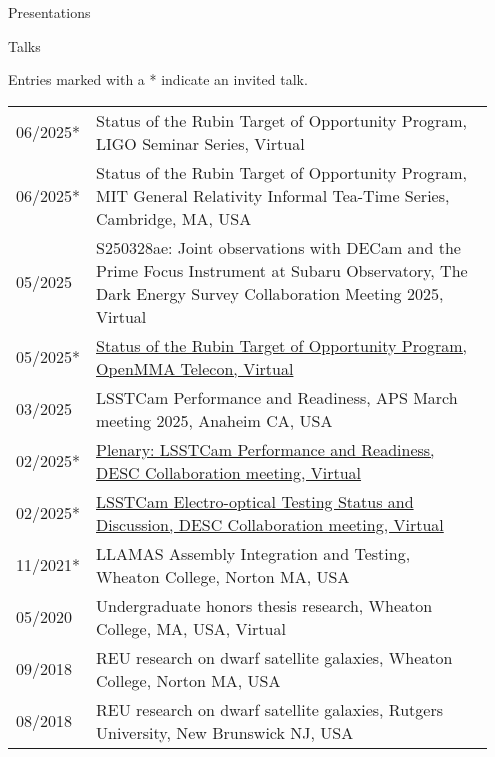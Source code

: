 \documentclass{resume} %
\begin{document}
\begin{rSection}{Presentations}

\begin{rSubsection}{Talks}{}{}{}

Entries marked with a * indicate an invited talk.

    \begin{table}[h]
\begin{tabular}{p{0.07\linewidth} p{0.88\linewidth}}
06/2025* & Status of the Rubin Target of Opportunity Program, LIGO Seminar Series, Virtual\\
06/2025* & Status of the Rubin Target of Opportunity Program, MIT General Relativity Informal Tea-Time Series, Cambridge, MA, USA\\
05/2025 & S250328ae: Joint observations with DECam and the Prime Focus Instrument at Subaru Observatory, The Dark Energy Survey Collaboration Meeting 2025, Virtual\\
05/2025* & \href{https://github.com/scimma/openMMA/wiki/Telecon20250522}{Status of the Rubin Target of Opportunity Program, OpenMMA Telecon, Virtual}\\
03/2025 & LSSTCam Performance and Readiness, APS March meeting 2025, Anaheim CA, USA\\
02/2025* & \href{https://docs.google.com/presentation/d/18RmTzV5id9RSE4_1xui-RJvK5FeGknrt8Ro1nBn32nk/edit?usp=sharing}{Plenary: LSSTCam Performance and Readiness, DESC Collaboration meeting, Virtual}\\
02/2025* & \href{https://docs.google.com/presentation/d/12EPsuWSixo40_oqrDPNaXstYnqDzhI_2aFL2hd7IwTE/edit#slide=id.g2ade3bc380_0_0}{LSSTCam Electro-optical Testing Status and Discussion, DESC Collaboration meeting, Virtual}\\
11/2021* & LLAMAS Assembly Integration and Testing, Wheaton College, Norton MA, USA\\
05/2020 & Undergraduate honors thesis research, Wheaton College, MA, USA, Virtual\\ 
09/2018 & REU research on dwarf satellite galaxies, Wheaton College, Norton MA, USA\\
08/2018 & REU research on dwarf satellite galaxies, Rutgers University, New Brunswick NJ, USA\\
\end{tabular}
\end{table}
\end{rSubsection}


\end{rSection}
\end{document}
